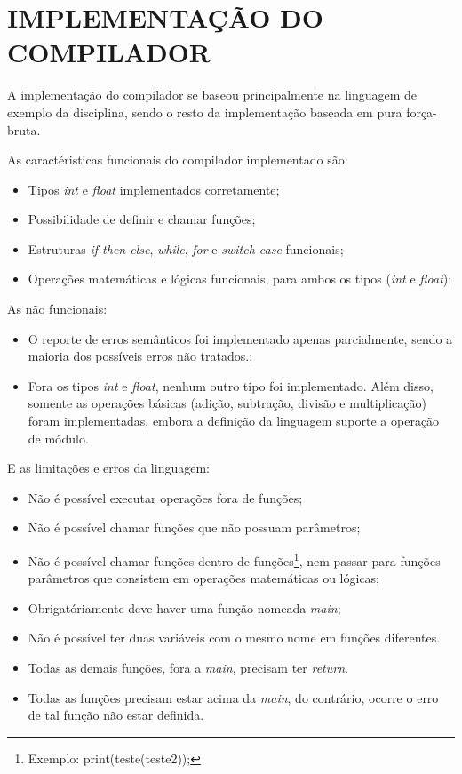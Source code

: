 \section{\normalsize IMPLEMENTAÇÃO DO COMPILADOR}
	A implementação do compilador se baseou principalmente na linguagem de exemplo da disciplina, sendo o resto da implementação baseada em pura força-bruta.
	
	As caractéristicas funcionais do compilador implementado são:
	
	\begin{itemize}
		\item Tipos \textit{int} e \textit{float} implementados corretamente;
		\item Possibilidade de definir e chamar funções;
		\item Estruturas \textit{if-then-else}, \textit{while}, \textit{for} e \textit{switch-case} funcionais;
		\item Operações matemáticas e lógicas funcionais, para ambos os tipos (\textit{int} e \textit{float});
	\end{itemize}
	
	As não funcionais:
	\begin{itemize}
		\item O reporte de erros semânticos foi implementado apenas parcialmente, sendo a maioria dos possíveis erros não tratados.;
		\item Fora os tipos \textit{int} e \textit{float}, nenhum outro tipo foi implementado. Além disso, somente as operações básicas (adição, subtração, divisão e multiplicação) foram implementadas, embora a definição da linguagem suporte a operação de módulo.
	\end{itemize}
	
	E as limitações e erros da linguagem:
	\begin{itemize}
		\item Não é possível executar operações fora de funções;
		\item Não é possível chamar funções que não possuam parâmetros;
		\item Não é possível chamar funções dentro de funções\footnote{Exemplo: print(teste(teste2));}, nem passar para funções parâmetros que consistem em operações matemáticas ou lógicas;
		\item Obrigatóriamente deve haver uma função nomeada \textit{main};
		\item Não é possível ter duas variáveis com o mesmo nome em funções diferentes.
		\item Todas as demais funções, fora a \textit{main}, precisam ter \textit{return}.
		\item Todas as funções precisam estar acima da \textit{main}, do contrário, ocorre o erro de tal função não estar definida.
	\end{itemize}